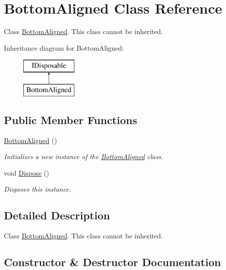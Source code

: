 \hypertarget{class_bottom_aligned}{}\section{Bottom\+Aligned Class Reference}
\label{class_bottom_aligned}


Class \hyperlink{class_bottom_aligned}{Bottom\+Aligned}. This class cannot be inherited.  


Inheritance diagram for Bottom\+Aligned\+:\begin{figure}[H]
\begin{center}
\leavevmode
\includegraphics[height=2.000000cm]{class_bottom_aligned}
\end{center}
\end{figure}
\subsection*{Public Member Functions}
\begin{DoxyCompactItemize}
\item 
\hyperlink{class_bottom_aligned_af6e0c9de681eb8523114b83bb5e0dbb1}{Bottom\+Aligned} ()
\begin{DoxyCompactList}\small\item\em Initializes a new instance of the \hyperlink{class_bottom_aligned}{Bottom\+Aligned} class. \end{DoxyCompactList}\item 
void \hyperlink{class_bottom_aligned_adcb96199970f967c2a4672830ba19508}{Dispose} ()
\begin{DoxyCompactList}\small\item\em Disposes this instance. \end{DoxyCompactList}\end{DoxyCompactItemize}


\subsection{Detailed Description}
Class \hyperlink{class_bottom_aligned}{Bottom\+Aligned}. This class cannot be inherited. 



\subsection{Constructor \& Destructor Documentation}
\mbox{\label{class_bottom_aligned_af6e0c9de681eb8523114b83bb5e0dbb1}} 
